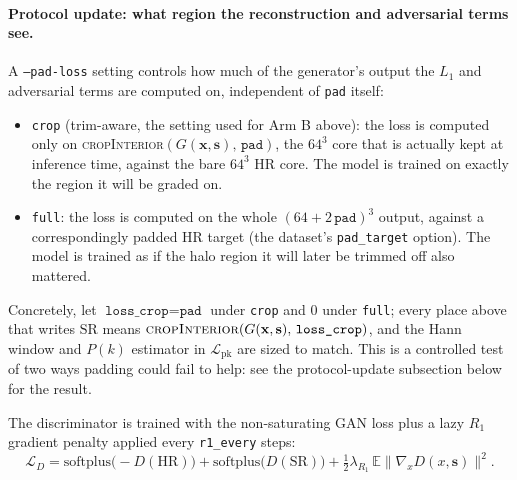 \paragraph{Protocol update: what region the reconstruction and adversarial
terms see.} A \texttt{--pad-loss} setting controls how much of the generator's
output the $L_1$ and adversarial terms are computed on, independent of
\texttt{pad} itself:
\begin{itemize}
  \item \texttt{crop} (trim-aware, the setting used for Arm B above): the loss
  is computed only on \textsc{cropInterior}$(G(\mathbf x,\mathbf s),\,\texttt{pad})$,
  the $64^3$ core that is actually kept at inference time, against the bare
  $64^3$ HR core. The model is trained on exactly the region it will be graded
  on.
  \item \texttt{full}: the loss is computed on the whole $(64{+}2\,\texttt{pad})^3$
  output, against a correspondingly padded HR target (the dataset's
  \texttt{pad\_target} option). The model is trained as if the halo region it
  will later be trimmed off also mattered.
\end{itemize}
Concretely, let $\texttt{loss\_crop}=\texttt{pad}$ under \texttt{crop} and $0$
under \texttt{full}; every place above that writes $\mathrm{SR}$ means
$\textsc{cropInterior}(G(\mathbf x,\mathbf s),\,\texttt{loss\_crop})$, and the
Hann window and $P(k)$ estimator in $\mathcal L_\text{pk}$ are sized to match.
This is a controlled test of two ways padding could fail to help: see the
protocol-update subsection below for the result.

The discriminator is trained with the non-saturating GAN loss plus a lazy $R_1$
gradient penalty applied every \texttt{r1\_every} steps:
\begin{equation}
  \mathcal L_D = \mathrm{softplus}\!\big({-}D(\mathrm{HR})\big)
               + \mathrm{softplus}\!\big(D(\mathrm{SR})\big)
               + \tfrac{1}{2}\lambda_{R_1}\,\mathbb E\big\lVert \nabla_{\!x} D(x,\mathbf s)\big\rVert^2 .
  \label{eq:srs-lossD}
\end{equation}


